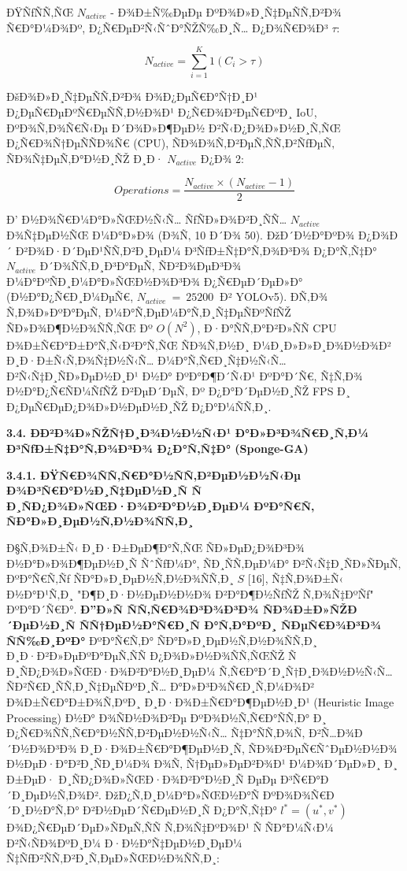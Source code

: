 \documentclass[]{article}
\begin{document}
ÐŸÑƒÑÑ‚ÑŒ \(N_{active}\) - Ð¾Ð±Ñ‰ÐµÐµ ÐºÐ¾Ð»Ð¸Ñ‡ÐµÑÑ‚Ð²Ð¾ Ñ€Ð°Ð¼Ð¾Ðº, Ð¿Ñ€ÐµÐ²Ñ‹ÑˆÐ°ÑŽÑ‰Ð¸Ñ… Ð¿Ð¾Ñ€Ð¾Ð³ \(\tau\):

\[N_{active} = \sum_{i = 1}^{K}1\left( C_{i} > \tau \right)\]

ÐšÐ¾Ð»Ð¸Ñ‡ÐµÑÑ‚Ð²Ð¾ Ð¾Ð¿ÐµÑ€Ð°Ñ†Ð¸Ð¹ Ð¿ÐµÑ€ÐµÐºÑ€ÐµÑÑ‚Ð½Ð¾Ð¹ Ð¿Ñ€Ð¾Ð²ÐµÑ€ÐºÐ¸ IoU, ÐºÐ¾Ñ‚Ð¾Ñ€Ñ‹Ðµ Ð´Ð¾Ð»Ð¶ÐµÐ½ Ð²Ñ‹Ð¿Ð¾Ð»Ð½Ð¸Ñ‚ÑŒ Ð¿Ñ€Ð¾Ñ†ÐµÑÑÐ¾Ñ€ (CPU), ÑÐ¾Ð¾Ñ‚Ð²ÐµÑ‚ÑÑ‚Ð²ÑƒÐµÑ‚ ÑÐ¾Ñ‡ÐµÑ‚Ð°Ð½Ð¸ÑŽ Ð¸Ð· \(N_{active}\) Ð¿Ð¾ 2:

\[Operations = \frac{N_{active} \times \left( N_{active} - 1 \right)}{2}\]

Ð’ Ð½Ð¾Ñ€Ð¼Ð°Ð»ÑŒÐ½Ñ‹Ñ… ÑƒÑÐ»Ð¾Ð²Ð¸ÑÑ… \(N_{active}\) Ð¾Ñ‡ÐµÐ½ÑŒ Ð¼Ð°Ð»Ð¾ (Ð¾Ñ‚ 10 Ð´Ð¾ 50). ÐžÐ´Ð½Ð°ÐºÐ¾ Ð¿Ð¾Ð´ Ð²Ð¾Ð·Ð´ÐµÐ¹ÑÑ‚Ð²Ð¸ÐµÐ¼ Ð³ÑƒÐ±Ñ‡Ð°Ñ‚Ð¾Ð³Ð¾ Ð¿Ð°Ñ‚Ñ‡Ð° \(N_{active}\) Ð´Ð¾ÑÑ‚Ð¸Ð³Ð°ÐµÑ‚ ÑÐ²Ð¾ÐµÐ³Ð¾ Ð¼Ð°ÐºÑÐ¸Ð¼Ð°Ð»ÑŒÐ½Ð¾Ð³Ð¾ Ð¿Ñ€ÐµÐ´ÐµÐ»Ð° (Ð½Ð°Ð¿Ñ€Ð¸Ð¼ÐµÑ€, \(N_{active}\  = \ 25200\ \) Ð² YOLOv5). Ð­Ñ‚Ð¾ Ñ‚Ð¾Ð»ÐºÐ°ÐµÑ‚ Ð¼Ð°Ñ‚ÐµÐ¼Ð°Ñ‚Ð¸Ñ‡ÐµÑÐºÑƒÑŽ ÑÐ»Ð¾Ð¶Ð½Ð¾ÑÑ‚ÑŒ Ðº \(O(N^{2})\), Ð·Ð°ÑÑ‚Ð°Ð²Ð»ÑÑ CPU Ð¾Ð±Ñ€Ð°Ð±Ð°Ñ‚Ñ‹Ð²Ð°Ñ‚ÑŒ ÑÐ¾Ñ‚Ð½Ð¸ Ð¼Ð¸Ð»Ð»Ð¸Ð¾Ð½Ð¾Ð² Ð¸Ð·Ð±Ñ‹Ñ‚Ð¾Ñ‡Ð½Ñ‹Ñ… Ð¼Ð°Ñ‚Ñ€Ð¸Ñ‡Ð½Ñ‹Ñ… Ð²Ñ‹Ñ‡Ð¸ÑÐ»ÐµÐ½Ð¸Ð¹ Ð½Ð° ÐºÐ°Ð¶Ð´Ñ‹Ð¹ ÐºÐ°Ð´Ñ€, Ñ‡Ñ‚Ð¾ Ð½Ð°Ð¿Ñ€ÑÐ¼ÑƒÑŽ Ð²ÐµÐ´ÐµÑ‚ Ðº Ð¿Ð°Ð´ÐµÐ½Ð¸ÑŽ FPS Ð¸ Ð¿ÐµÑ€ÐµÐ¿Ð¾Ð»Ð½ÐµÐ½Ð¸ÑŽ Ð¿Ð°Ð¼ÑÑ‚Ð¸.

\textbf{3.4. Ð­Ð²Ð¾Ð»ÑŽÑ†Ð¸Ð¾Ð½Ð½Ñ‹Ð¹ Ð°Ð»Ð³Ð¾Ñ€Ð¸Ñ‚Ð¼ Ð³ÑƒÐ±Ñ‡Ð°Ñ‚Ð¾Ð³Ð¾ Ð¿Ð°Ñ‚Ñ‡Ð° (Sponge-GA)}

\textbf{3.4.1. ÐŸÑ€Ð¾ÑÑ‚Ñ€Ð°Ð½ÑÑ‚Ð²ÐµÐ½Ð½Ñ‹Ðµ Ð¾Ð³Ñ€Ð°Ð½Ð¸Ñ‡ÐµÐ½Ð¸Ñ Ñ Ð¸ÑÐ¿Ð¾Ð»ÑŒÐ·Ð¾Ð²Ð°Ð½Ð¸ÐµÐ¼ ÐºÐ°Ñ€Ñ‚ ÑÐ°Ð»Ð¸ÐµÐ½Ñ‚Ð½Ð¾ÑÑ‚Ð¸}

Ð§Ñ‚Ð¾Ð±Ñ‹ Ð¸Ð·Ð±ÐµÐ¶Ð°Ñ‚ÑŒ ÑÐ»ÐµÐ¿Ð¾Ð³Ð¾ Ð½Ð°Ð»Ð¾Ð¶ÐµÐ½Ð¸Ñ ÑˆÑƒÐ¼Ð°, ÑÐ¸ÑÑ‚ÐµÐ¼Ð° Ð²Ñ‹Ñ‡Ð¸ÑÐ»ÑÐµÑ‚ ÐºÐ°Ñ€Ñ‚Ñƒ ÑÐ°Ð»Ð¸ÐµÐ½Ñ‚Ð½Ð¾ÑÑ‚Ð¸ \(S\) {[}16{]}, Ñ‡Ñ‚Ð¾Ð±Ñ‹ Ð½Ð°Ð¹Ñ‚Ð¸ "Ð¶Ð¸Ð·Ð½ÐµÐ½Ð½Ð¾ Ð²Ð°Ð¶Ð½ÑƒÑŽ Ñ‚Ð¾Ñ‡ÐºÑƒ" ÐºÐ°Ð´Ñ€Ð°. \textbf{Ð”Ð»Ñ ÑÑ‚Ñ€Ð¾Ð³Ð¾Ð³Ð¾ ÑÐ¾Ð±Ð»ÑŽÐ´ÐµÐ½Ð¸Ñ ÑÑ†ÐµÐ½Ð°Ñ€Ð¸Ñ Ð°Ñ‚Ð°ÐºÐ¸ ÑÐµÑ€Ð¾Ð³Ð¾ ÑÑ‰Ð¸ÐºÐ°} ÐºÐ°Ñ€Ñ‚Ð° ÑÐ°Ð»Ð¸ÐµÐ½Ñ‚Ð½Ð¾ÑÑ‚Ð¸ Ð¸Ð·Ð²Ð»ÐµÐºÐ°ÐµÑ‚ÑÑ Ð¿Ð¾Ð»Ð½Ð¾ÑÑ‚ÑŒÑŽ Ñ Ð¸ÑÐ¿Ð¾Ð»ÑŒÐ·Ð¾Ð²Ð°Ð½Ð¸ÐµÐ¼ Ñ‚Ñ€Ð°Ð´Ð¸Ñ†Ð¸Ð¾Ð½Ð½Ñ‹Ñ… ÑÐ²Ñ€Ð¸ÑÑ‚Ð¸Ñ‡ÐµÑÐºÐ¸Ñ… Ð°Ð»Ð³Ð¾Ñ€Ð¸Ñ‚Ð¼Ð¾Ð² Ð¾Ð±Ñ€Ð°Ð±Ð¾Ñ‚ÐºÐ¸ Ð¸Ð·Ð¾Ð±Ñ€Ð°Ð¶ÐµÐ½Ð¸Ð¹ (Heuristic Image Processing) Ð½Ð° Ð¾ÑÐ½Ð¾Ð²Ðµ ÐºÐ¾Ð½Ñ‚Ñ€Ð°ÑÑ‚Ð° Ð¸ Ð¿Ñ€Ð¾ÑÑ‚Ñ€Ð°Ð½ÑÑ‚Ð²ÐµÐ½Ð½Ñ‹Ñ… Ñ‡Ð°ÑÑ‚Ð¾Ñ‚ Ð²Ñ…Ð¾Ð´Ð½Ð¾Ð³Ð¾ Ð¸Ð·Ð¾Ð±Ñ€Ð°Ð¶ÐµÐ½Ð¸Ñ, ÑÐ¾Ð²ÐµÑ€ÑˆÐµÐ½Ð½Ð¾ Ð½ÐµÐ·Ð°Ð²Ð¸ÑÐ¸Ð¼Ð¾ Ð¾Ñ‚ Ñ†ÐµÐ»ÐµÐ²Ð¾Ð¹ Ð¼Ð¾Ð´ÐµÐ»Ð¸ Ð¸ Ð±ÐµÐ· Ð¸ÑÐ¿Ð¾Ð»ÑŒÐ·Ð¾Ð²Ð°Ð½Ð¸Ñ ÐµÐµ Ð³Ñ€Ð°Ð´Ð¸ÐµÐ½Ñ‚Ð¾Ð². ÐžÐ¿Ñ‚Ð¸Ð¼Ð°Ð»ÑŒÐ½Ð°Ñ ÐºÐ¾Ð¾Ñ€Ð´Ð¸Ð½Ð°Ñ‚Ð° Ð²Ð½ÐµÐ´Ñ€ÐµÐ½Ð¸Ñ Ð¿Ð°Ñ‚Ñ‡Ð° \(l^{*} = \left( u^{*},v^{*} \right)\) Ð¾Ð¿Ñ€ÐµÐ´ÐµÐ»ÑÐµÑ‚ÑÑ Ñ‚Ð¾Ñ‡ÐºÐ¾Ð¹ Ñ ÑÐ°Ð¼Ñ‹Ð¼ Ð²Ñ‹ÑÐ¾ÐºÐ¸Ð¼ Ð·Ð½Ð°Ñ‡ÐµÐ½Ð¸ÐµÐ¼ Ñ‡ÑƒÐ²ÑÑ‚Ð²Ð¸Ñ‚ÐµÐ»ÑŒÐ½Ð¾ÑÑ‚Ð¸:
\end{document}
